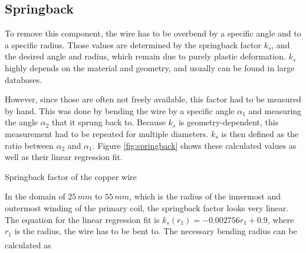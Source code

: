 \subsection{Springback}

To remove this component, the wire has to be overbend by a specific angle and to a specific radius. Those values are determined by the springback factor \(k_s\), and the desired angle and radius, which remain due to purely plastic deformation. \(k_s\) highly depends on the material and geometry, and usually can be found in large databases.

However, since those are often not freely available, this factor had to be measured by hand. This was done by bending the wire by a specific angle \(\alpha_1\) and measuring the angle \(\alpha_2\) that it sprung back to. Because \(k_s\) is geometry-dependent, this measurement had to be repeated for multiple diameters. \(k_s\) is then defined as the ratio between \(\alpha_2\) and \(\alpha_1\). Figure \ref{fig:springback} shows these calculated values as well as their linear regression fit.

\begin{marginfigure}[-1cm]
    \centering
    \caption{Springback factor of the copper wire}
    \label{fig:springback}
\end{marginfigure}

In the domain of \(25\,mm\) to \(55\,mm\), which is the radius of the innermost and outermost winding of the primary coil, the springback factor looks very linear. The equation for the linear regression fit is \(k_s(r_1) = -0.002756 r_1 + 0.9\), where \(r_1\) is the radius, the wire has to be bent to. The necessary bending radius can be calculated as\textsuperscript{}

